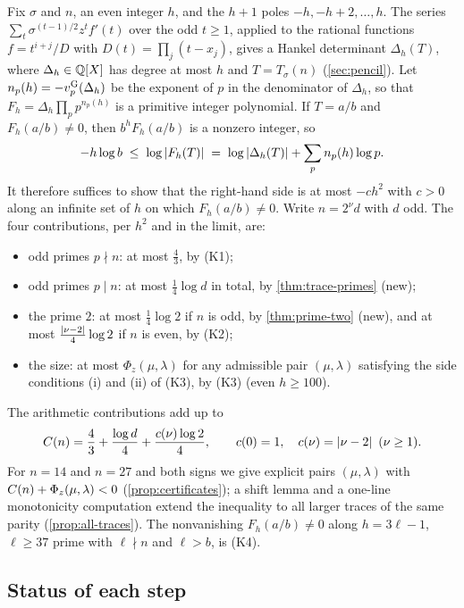 Fix $\sigma$ and $n$, an even integer $h$, and the $h+1$ poles $-h,-h+2,\dots,h$. The series
$\sum_{t}\sigma^{(t-1)/2}z^t f'(t)$ over the odd $t\ge1$, applied to the rational functions
$f=t^{i+j}/D$ with $D(t)=\prod_j(t-x_j)$, gives a Hankel determinant $\Delta_h(T)$, where
$\Delta_h\in\mathbb{Q}[X]$ has degree at most $h$ and $T=T_\sigma(n)$ (\cref{sec:pencil}). Let
$n_p(h)=-v_{p}^{\mathrm{G}}(\Delta_h)$ be the exponent of $p$ in the denominator of $\Delta_h$, so that
$F_h=\Delta_h\prod_pp^{n_p(h)}$ is a primitive integer polynomial. If $T=a/b$ and
$F_h(a/b)\ne0$, then $b^hF_h(a/b)$ is a nonzero integer, so
\[
-h\log b\;\le\;\log\left\lvert F_h(T)\right\rvert\;=\;\log\left\lvert \Delta_h(T)\right\rvert+\sum_pn_p(h)\log p .
\]
It therefore suffices to show that the right-hand side is at most $-ch^2$ with $c>0$ along an
infinite set of $h$ on which $F_h(a/b)\ne0$. Write $n=2^\nu d$ with $d$ odd. The four
contributions, per $h^2$ and in the limit, are:
\begin{itemize}
\item odd primes $p\nmid n$: at most $\frac43$, by (K1);
\item odd primes $p\mid n$: at most $\frac14\log d$ in total, by \cref{thm:trace-primes} (new);
\item the prime $2$: at most $\frac14\log2$ if $n$ is odd, by \cref{thm:prime-two} (new), and at
most $\frac{\left\lvert \nu-2\right\rvert}4\log2$ if $n$ is even, by (K2);
\item the size: at most $\Phi_z(\mu,\lambda)$ for any admissible pair $(\mu,\lambda)$ satisfying the side conditions (i) and (ii) of (K3), by (K3) (even $h\ge100$).
\end{itemize}
The arithmetic contributions add up to
\begin{equation}\label{eq:arith-constant}
C(n)=\frac43+\frac{\log d}{4}+\frac{c(\nu)\log 2}{4},\qquad c(0)=1,\quad c(\nu)=\left\lvert \nu-2\right\rvert\ (\nu\ge1).
\end{equation}
For $n=14$ and $n=27$ and both signs we give explicit pairs $(\mu,\lambda)$ with
$C(n)+\Phi_z(\mu,\lambda)<0$ (\cref{prop:certificates}); a shift lemma and a one-line
monotonicity computation extend the inequality to all larger traces of the same parity
(\cref{prop:all-traces}). The nonvanishing $F_h(a/b)\ne0$ along $h=3\ell-1$, $\ell\ge37$ prime with $\ell\nmid n$ and $\ell>b$, is
(K4).

\subsection{Status of each step}\label{subsec:step-status}

